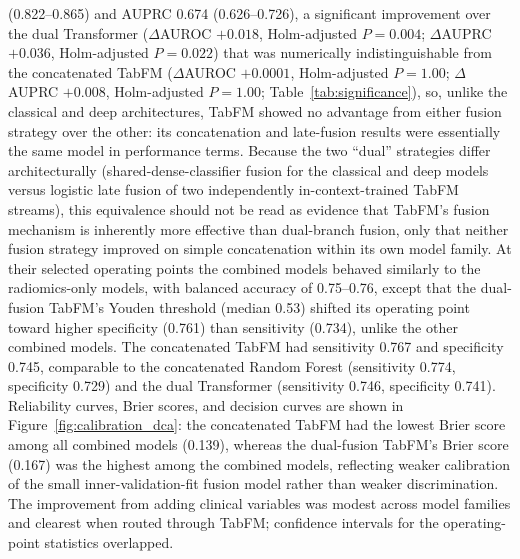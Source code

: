 \documentclass[11pt]{article}
\begin{document}
(0.822--0.865) and AUPRC 0.674 (0.626--0.726), a significant improvement over
the dual Transformer ($\Delta$AUROC $+0.018$, Holm-adjusted $P=0.004$;
$\Delta$AUPRC $+0.036$, Holm-adjusted $P=0.022$) that was numerically
indistinguishable from the concatenated TabFM ($\Delta$AUROC $+0.0001$,
Holm-adjusted $P=1.00$; $\Delta$AUPRC $+0.008$, Holm-adjusted $P=1.00$;
Table~\ref{tab:significance}), so, unlike the classical and deep architectures,
TabFM showed no advantage from either fusion strategy over the other: its
concatenation and late-fusion results were essentially the same model in
performance terms. Because the two ``dual'' strategies differ architecturally
(shared-dense-classifier fusion for the classical and deep models versus
logistic late fusion of two independently in-context-trained TabFM streams),
this equivalence should not be read as evidence that TabFM's fusion mechanism
is inherently more effective than dual-branch fusion, only that neither
fusion strategy improved on simple concatenation within its own model family.
At their selected operating points the combined models behaved similarly to the
radiomics-only models, with balanced accuracy of 0.75--0.76, except that the
dual-fusion TabFM's Youden threshold (median 0.53) shifted its operating point
toward higher specificity (0.761) than sensitivity (0.734), unlike the other
combined models. The concatenated TabFM had sensitivity 0.767 and specificity
0.745, comparable to the concatenated Random Forest (sensitivity 0.774,
specificity 0.729) and the dual Transformer (sensitivity 0.746, specificity
0.741). Reliability curves, Brier scores, and decision curves are shown in
Figure~\ref{fig:calibration_dca}: the concatenated TabFM had the lowest Brier
score among all combined models (0.139), whereas the dual-fusion TabFM's Brier
score (0.167) was the highest among the combined models, reflecting weaker
calibration of the small inner-validation-fit fusion model rather than weaker
discrimination. The improvement from adding clinical variables was modest
across model families and clearest when routed through TabFM; confidence
intervals for the operating-point statistics overlapped.
\end{document}
